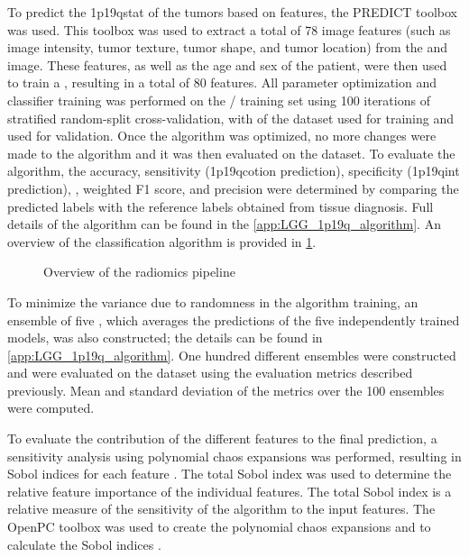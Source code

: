 To predict the \acl{1p19qstat} of the tumors based on  features, the PREDICT toolbox was used.
This toolbox was used to extract a total of 78 image features (such as image intensity, tumor texture, tumor shape, and tumor location) from the  and   image.
These features, as well as the age and sex of the patient, were then used to train a , resulting in a total of 80 features.
All parameter optimization and classifier training was performed on the / training set using 100 iterations of stratified random-split cross-validation, with  of the dataset used for training and  used for validation.
Once the algorithm was optimized, no more changes were made to the algorithm and it was then evaluated on the  dataset.
To evaluate the algorithm, the accuracy, sensitivity (\acl{1p19qcotion} prediction), specificity (\acl{1p19qint} prediction), , weighted F1 score, and precision were determined by comparing the predicted labels with the reference labels obtained from tissue diagnosis.
Full details of the algorithm can be found in the \cref{app:LGG_1p19q_algorithm}.
An overview of the classification algorithm is provided in \cref{fig:LGG_1p19q_radiomics_pipeline}.


\begin{figure}
    \centering
    \caption{Overview of the radiomics pipeline}\label{fig:LGG_1p19q_radiomics_pipeline}
\end{figure}


To minimize the variance due to randomness in the algorithm training, an ensemble of five , which averages the predictions of the five independently trained models, was also constructed; the details can be found in \cref{app:LGG_1p19q_algorithm}.
One hundred different ensembles were constructed and were evaluated on the  dataset using the evaluation metrics described previously.
Mean and standard deviation of the metrics over the 100 ensembles were computed.

To evaluate the contribution of the different features to the final prediction, a sensitivity analysis using polynomial chaos expansions was performed, resulting in Sobol indices for each feature \autocite{sudret2008global}.
The total Sobol index was used to determine the relative feature importance of the individual features.
The total Sobol index is a relative measure of the sensitivity of the algorithm to the input features.
The OpenPC toolbox was used to create the polynomial chaos expansions and to calculate the Sobol indices \autocite{perko2016fast, van2016robustness}.

